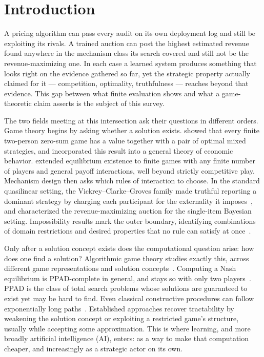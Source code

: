 
\section{Introduction}
\label{sec:intro}

A pricing algorithm can pass every audit on its own deployment log and still be
exploiting its rivals. A trained auction can post the highest estimated revenue
found anywhere in the mechanism class its search covered and still not be the
revenue-maximizing one. In each case a
learned system produces something that looks right on the evidence gathered so
far, yet the strategic property actually claimed for it --- competition,
optimality, truthfulness --- reaches beyond that evidence. This gap between what
finite evaluation shows and what a game-theoretic claim asserts is the subject of
this survey.

The two fields meeting at this intersection ask their
questions in different orders. Game theory begins by asking whether a solution exists.
 showed that every finite two-person zero-sum game has a value
together with a pair of optimal mixed strategies, and \citet{vNM1944}
incorporated this result into a general theory of economic behavior.
\citet{Nash1951} extended equilibrium existence to finite games with any finite
number of players and general payoff interactions, well beyond strictly
competitive play. Mechanism design then asks which rules of interaction to
choose. In the standard quasilinear setting, the Vickrey--Clarke--Groves family
made truthful reporting a dominant strategy by charging each participant for the
externality it imposes~\citep{Vickrey1961,Clarke1971,Groves1973}, and
\citet{Myerson1981} characterized the revenue-maximizing auction for the
single-item Bayesian setting. Impossibility results mark the outer boundary,
identifying combinations of domain restrictions and desired properties that no rule can
satisfy at once~\citep{Arrow1951,Gibbard1973,Satterthwaite1975}.

Only after a solution concept exists does the computational question arise: how
does one find a solution? Algorithmic game theory studies exactly this, across
different game representations and solution
concepts~\mbox{\citep{NisanRoughgardenTardosVazirani2007}}. Computing a Nash equilibrium is PPAD-complete in general, and stays so with
only two players~\citep{DaskalakisGoldbergPapadimitriou2009,ChenDengTeng2009}.
PPAD is the class of total search problems whose solutions are guaranteed to
exist yet may be hard to find. Even classical constructive procedures can
follow exponentially long paths~\citep{LemkeHowson1964,SavaniVonStengel2006}. Established approaches recover
tractability by weakening the solution concept or exploiting a restricted game's
structure, usually while accepting some approximation. This is where learning, and more broadly artificial intelligence (AI), enters:
as a way to make that computation cheaper, and increasingly as a strategic
actor on its own.

